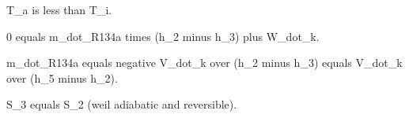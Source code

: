 T_a is less than T_i.

0 equals m_dot_R134a times (h_2 minus h_3) plus W_dot_k.

m_dot_R134a equals negative V_dot_k over (h_2 minus h_3) equals V_dot_k over (h_5 minus h_2).

S_3 equals S_2 (weil adiabatic and reversible).